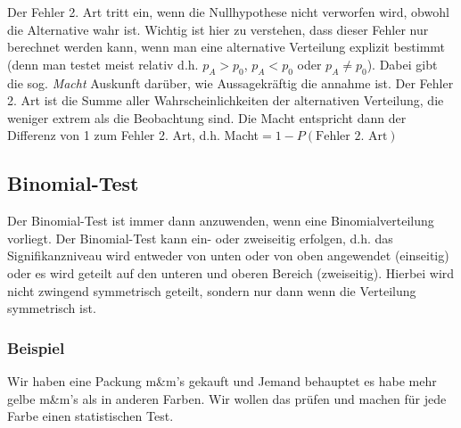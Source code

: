Der Fehler 2. Art tritt ein, wenn die Nullhypothese nicht verworfen
wird, obwohl die Alternative wahr ist. Wichtig ist hier zu verstehen,
dass dieser Fehler nur berechnet werden kann, wenn man eine alternative
Verteilung explizit bestimmt (denn man testet meist relativ d.h.
$p_A > p_0$, $p_A < p_0$ oder $p_A \neq p_0$).
Dabei gibt die sog. \emph{Macht} Auskunft darüber, wie Aussagekräftig
die annahme ist.
Der Fehler 2. Art ist die Summe aller Wahrscheinlichkeiten der alternativen
Verteilung, die weniger extrem als die Beobachtung sind.
Die Macht entspricht dann der Differenz von 1 zum Fehler 2. Art, 
d.h. Macht$=1-P(\text{Fehler 2. Art})$

\subsection{Binomial-Test}
Der Binomial-Test ist immer dann anzuwenden, wenn eine Binomialverteilung
vorliegt. Der Binomial-Test kann ein- oder zweiseitig erfolgen, d.h. das
Signifikanzniveau wird entweder von unten oder von oben angewendet (einseitig)
oder es wird geteilt auf den unteren und oberen Bereich (zweiseitig). 
Hierbei wird nicht zwingend symmetrisch geteilt, sondern nur dann wenn
die Verteilung symmetrisch ist.

\subsubsection*{Beispiel}
Wir haben eine Packung m\&m's gekauft und Jemand behauptet es habe
mehr gelbe m\&m's als in anderen Farben. Wir wollen das prüfen und
machen für jede Farbe einen statistischen Test.

